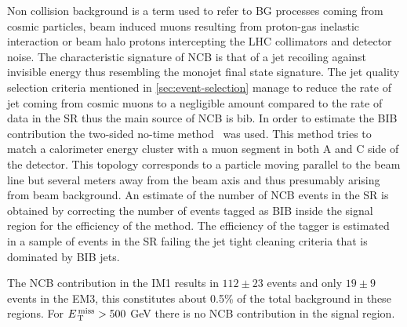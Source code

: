 Non collision background is a term used to refer to BG processes coming from
cosmic particles, beam induced muons resulting from proton-gas inelastic
interaction or beam halo protons intercepting the LHC collimators and detector
noise. The characteristic signature of NCB is that of a jet recoiling against
invisible energy thus resembling the monojet final state signature. The jet
quality selection criteria mentioned in \cref{sec:event-selection} manage to
reduce the rate of jet coming from cosmic muons to a negligible amount compared
to the rate of data in the SR thus the main source of NCB is \gls{bib}. In order
to estimate the BIB contribution the two-sided no-time
method~\cite{BeamInducedBackground} was used. This method tries to match a
calorimeter energy cluster with a muon segment in both A and C side of the
detector. This topology corresponds to a particle moving parallel to the beam
line but several meters away from the beam axis and thus presumably arising from
beam background. An estimate of the number of NCB events in the SR is obtained
by correcting the number of events tagged as BIB inside the signal region for
the efficiency of the method. The efficiency of the tagger is estimated in a
sample of events in the SR failing the jet tight cleaning criteria that is
dominated by BIB jets.

The NCB contribution in the IM1 results in $112 \pm 23$ events and only
$19 \pm 9$ events in the EM3, this constitutes about 0.5\% of the total
background in these regions. For $E_\mathrm{\, T}^\mathrm{\, miss} > 500~$GeV there is no NCB contribution
in the signal region.
